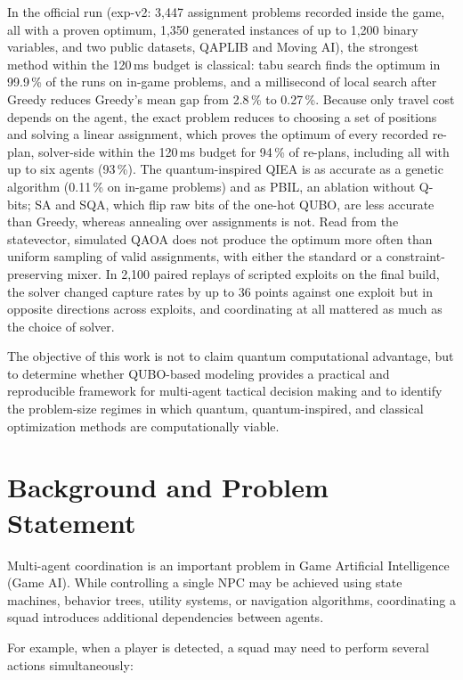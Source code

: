 \documentclass[12pt, a4paper]{article}
\begin{document}
In the official run (exp-v2: 3{,}447 assignment problems recorded inside the game, all with a proven optimum, 1{,}350 generated instances of up to 1{,}200 binary variables, and two public datasets, QAPLIB and Moving AI), the strongest method within the 120\,ms budget is classical: tabu search finds the optimum in 99.9\,\% of the runs on in-game problems, and a millisecond of local search after Greedy reduces Greedy's mean gap from 2.8\,\% to 0.27\,\%. Because only travel cost depends on the agent, the exact problem reduces to choosing a set of positions and solving a linear assignment, which proves the optimum of every recorded re-plan, solver-side within the 120\,ms budget for 94\,\% of re-plans, including all with up to six agents (93\,\%). The quantum-inspired QIEA is as accurate as a genetic algorithm (0.11\,\% on in-game problems) and as PBIL, an ablation without Q-bits; SA and SQA, which flip raw bits of the one-hot QUBO, are less accurate than Greedy, whereas annealing over assignments is not. Read from the statevector, simulated QAOA does not produce the optimum more often than uniform sampling of valid assignments, with either the standard or a constraint-preserving mixer. In 2{,}100 paired replays of scripted exploits on the final build, the solver changed capture rates by up to 36 points against one exploit but in opposite directions across exploits, and coordinating at all mattered as much as the choice of solver.

The objective of this work is not to claim quantum computational advantage, but to determine whether QUBO-based modeling provides a practical and reproducible framework for multi-agent tactical decision making and to identify the problem-size regimes in which quantum, quantum-inspired, and classical optimization methods are computationally viable.

\section*{Background and Problem Statement}

Multi-agent coordination is an important problem in Game Artificial Intelligence (Game AI). While controlling a single NPC may be achieved using state machines, behavior trees, utility systems, or navigation algorithms, coordinating a squad introduces additional dependencies between agents.

For example, when a player is detected, a squad may need to perform several actions simultaneously:
\end{document}
